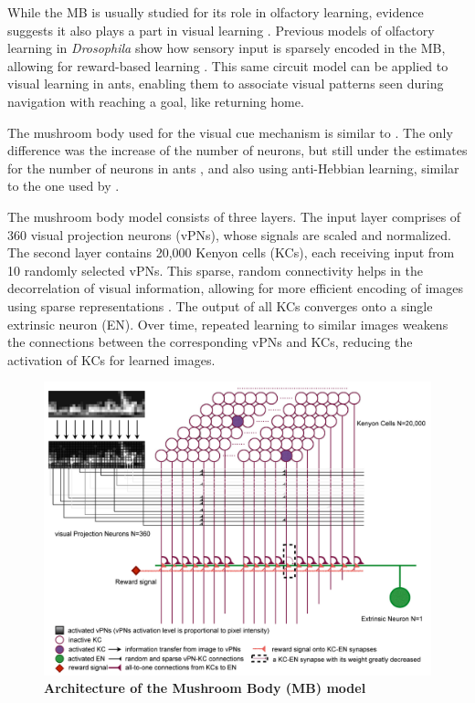 \documentclass[12pt,a4paper]{article}
\begin{document}
While the MB is usually studied for its role in olfactory learning, evidence suggests it also plays a part in visual learning \cite{heisenberg_2003}. Previous models of olfactory learning in \textit{Drosophila} show how sensory input is sparsely encoded in the MB, allowing for reward-based learning \cite{cassenaer_laurent_2012}. This same circuit model can be applied to visual learning in ants, enabling them to associate visual patterns seen during navigation with reaching a goal, like returning home.

The mushroom body used for the visual cue mechanism is similar to \cite{wessnitzer_young_armstrong_webb_2011}. The only difference was the increase of the number of neurons, but still under the estimates for the number of neurons in ants \cite{ehmer_gronenberg_2003}, and also using anti-Hebbian learning, similar to the one used by \cite{ardin_peng_mangan_lagogiannis_webb_2016}. 

The mushroom body model consists of three layers. The input layer comprises of 360 visual projection neurons (vPNs), whose signals are scaled and normalized. The second layer contains 20,000 Kenyon cells (KCs), each receiving input from 10 randomly selected vPNs. This sparse, random connectivity helps in the decorrelation of visual information, allowing for more efficient encoding of images using sparse representations \cite{laurent_2002}. The output of all KCs converges onto a single extrinsic neuron (EN). Over time, repeated learning to similar images weakens the connections between the corresponding vPNs and KCs, reducing the activation of KCs for learned images.

\begin{figure}[H]
    \centering
    \captionsetup{justification=centering, margin=2cm}
    \includegraphics[width=.8\linewidth]{mb_model.png}
    \caption{\textbf{Architecture of the Mushroom Body (MB) model} \cite{ardin_peng_mangan_lagogiannis_webb_2016}}
    \label{mb_model}
\end{figure}
\\~\\
\end{document}
